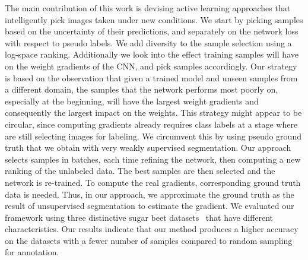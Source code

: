 \documentclass[letterpaper, 10 pt, conference]{ieeeconf}  %
\begin{document}
The main contribution of this work is devising active learning approaches that
intelligently pick images taken under new conditions. We start by picking samples based 
on the uncertainty of their predictions, and separately on the network loss with respect 
to pseudo labels. We add diversity to the sample selection using a log-space ranking.
Additionally we look into the effect training samples will have on the weight gradients of the CNN,
and pick samples accordingly.
Our strategy is based  on the observation that given a trained model and unseen
samples from  a different domain, the samples that the network performs most
poorly on, especially at the  beginning, will have the largest weight
gradients and consequently the largest impact on the  weights. This strategy might appear to be circular, since computing gradients already requires class labels at a stage where are still selecting images for labeling.  We circumvent this by using pseudo ground truth that we obtain with very weakly supervised segmentation. Our approach
selects samples in batches, each time refining the network, then computing a
new  ranking of the unlabeled data. The best samples are then selected and the
network is re-trained. To compute the real gradients, corresponding ground
truth data is needed. Thus, in our approach, we approximate the ground truth as the result of unsupervised segmentation to estimate the gradient.  We
evaluated our framework using three distinctive sugar beet datasets~\cite{chebrolu2017agricultural} that have different characteristics.  Our results indicate that our method produces a
higher accuracy on the datasets with a fewer  number of samples compared to
random sampling for annotation.





   
   
\end{document}
